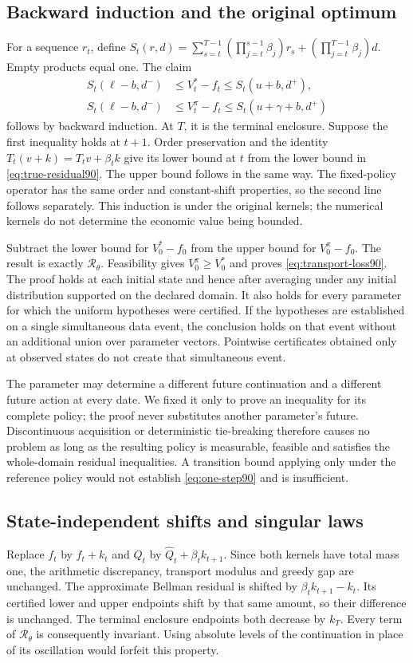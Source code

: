 \subsection{Backward induction and the original optimum}
For a sequence $r_t$, define $S_t(r,d)=\sum_{s=t}^{T-1}(\prod_{j=t}^{s-1}\beta_j)r_s+(\prod_{j=t}^{T-1}\beta_j)d$. Empty products equal one. The claim
\begin{align*}
 S_t(\ell-b,d^-)&\le V_t^*-f_t\le S_t(u+b,d^+),\\
 S_t(\ell-b,d^-)&\le V_t^\pi-f_t
                            \le S_t(u+\gamma+b,d^+)
\end{align*}
follows by backward induction. At $T$, it is the terminal enclosure. Suppose the first inequality holds at $t+1$. Order preservation and the identity $T_t(v+k)=T_t v+\beta_t k$ give its lower bound at $t$ from the lower bound in \eqref{eq:true-residual90}. The upper bound follows in the same way. The fixed-policy operator has the same order and constant-shift properties, so the second line follows separately. This induction is under the original kernels; the numerical kernels do not determine the economic value being bounded.

Subtract the lower bound for $V_0^*-f_0$ from the upper bound for $V_0^\pi-f_0$. The result is exactly $\mathcal R_\theta$. Feasibility gives $V_0^\pi\ge V_0^*$ and proves \eqref{eq:transport-loss90}. The proof holds at each initial state and hence after averaging under any initial distribution supported on the declared domain. It also holds for every parameter for which the uniform hypotheses were certified. If the hypotheses are established on a single simultaneous data event, the conclusion holds on that event without an additional union over parameter vectors. Pointwise certificates obtained only at observed states do not create that simultaneous event.

The parameter may determine a different future continuation and a different future action at every date. We fixed it only to prove an inequality for its complete policy; the proof never substitutes another parameter's future. Discontinuous acquisition or deterministic tie-breaking therefore causes no problem as long as the resulting policy is measurable, feasible and satisfies the whole-domain residual inequalities. A transition bound applying only under the reference policy would not establish \eqref{eq:one-step90} and is insufficient.

\subsection{State-independent shifts and singular laws}
Replace $f_t$ by $f_t+k_t$ and $\widehat Q_t$ by $\widehat Q_t+\beta_t k_{t+1}$. Since both kernels have total mass one, the arithmetic discrepancy, transport modulus and greedy gap are unchanged. The approximate Bellman residual is shifted by $\beta_t k_{t+1}-k_t$. Its certified lower and upper endpoints shift by that same amount, so their difference is unchanged. The terminal enclosure endpoints both decrease by $k_T$. Every term of $\mathcal R_\theta$ is consequently invariant. Using absolute levels of the continuation in place of its oscillation would forfeit this property.

